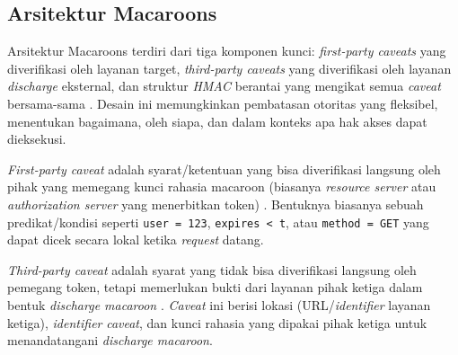 \subsection{Arsitektur Macaroons}
\label{subsec:arsitektur-macaroons}

Arsitektur Macaroons terdiri dari tiga komponen kunci: \textit{first-party caveats} yang diverifikasi oleh layanan target, \textit{third-party caveats} yang diverifikasi oleh layanan \textit{discharge} eksternal, dan struktur \textit{HMAC} berantai yang mengikat semua \textit{caveat} bersama-sama \autocite{birgisson2014macaroons}. Desain ini memungkinkan pembatasan otoritas yang fleksibel, menentukan bagaimana, oleh siapa, dan dalam konteks apa hak akses dapat dieksekusi.

\textit{First-party caveat} adalah syarat/ketentuan yang bisa diverifikasi langsung oleh pihak yang memegang kunci rahasia macaroon (biasanya \textit{resource server} atau \textit{authorization server} yang menerbitkan token) \autocite{birgisson2014macaroons}. Bentuknya biasanya sebuah predikat/kondisi seperti \texttt{user = 123}, \texttt{expires < t}, atau \texttt{method = GET} yang dapat dicek secara lokal ketika \textit{request} datang.

\textit{Third-party caveat} adalah syarat yang tidak bisa diverifikasi langsung oleh pemegang token, tetapi memerlukan bukti dari layanan pihak ketiga dalam bentuk \textit{discharge macaroon} \autocite{birgisson2014macaroons}. \textit{Caveat} ini berisi lokasi (URL/\textit{identifier} layanan ketiga), \textit{identifier} \textit{caveat}, dan kunci rahasia yang dipakai pihak ketiga untuk menandatangani \textit{discharge macaroon}.




